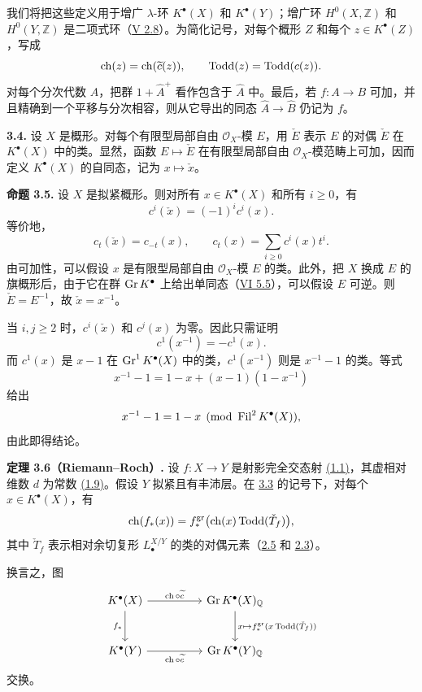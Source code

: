 我们将把这些定义用于增广 $\lambda$-环 $K^{\bullet}(X)$ 和 $K^{\bullet}(Y)$；增广环 $H^0(X,\mathbb Z)$ 和 $H^0(Y,\mathbb Z)$ 是二项式环（\hyperlink{sga6.e05.ex.2-8}{V 2.8}）。为简化记号，对每个概形 $Z$ 和每个 $z\in K^{\bullet}(Z)$，写成
\[
\operatorname{ch}(z)=\operatorname{ch}(\widetilde c(z)),
\qquad
\operatorname{Todd}(z)=\operatorname{Todd}(c(z)).
\]
对每个分次代数 $A$，把群 $1+\widehat A^+$ 看作包含于 $\widehat A$ 中。最后，若 $f:A\to B$ 可加，并且精确到一个平移与分次相容，则从它导出的同态 $\widehat A\to\widehat B$ 仍记为 $f$。

\textbf{3.4.} 设 $X$ 是概形。对每个有限型局部自由 $\mathcal O_X$-模 $E$，用 $\check E$ 表示 $E$ 的对偶 $\check E$ 在 $K^{\bullet}(X)$ 中的类。显然，函数 $E\mapsto\check E$ 在有限型局部自由 $\mathcal O_X$-模范畴上可加，因而定义 $K^{\bullet}(X)$ 的自同态，记为 $x\mapsto\check x$。

\textbf{命题 3.5.} 设 $X$ 是拟紧概形。则对所有 $x\in K^{\bullet}(X)$ 和所有 $i\geq0$，有
\[
c^i(\check x)=(-1)^i c^i(x).
\]
等价地，
\[
c_t(\check x)=c_{-t}(x),
\qquad
c_t(x)=\sum_{i\geq0}c^i(x)t^i.
\]
由可加性，可以假设 $x$ 是有限型局部自由 $\mathcal O_X$-模 $E$ 的类。此外，把 $X$ 换成 $E$ 的旗概形后，由于它在群 $\operatorname{Gr} K^{\bullet}$ 上给出单同态（\hyperlink{sga6.e06.cor.5-5}{VI 5.5}），可以假设 $E$ 可逆。则 $\check E=E^{-1}$，故 $\check x=x^{-1}$。

当 $i,j\geq2$ 时，$c^i(\check x)$ 和 $c^j(x)$ 为零。因此只需证明
\[
c^1(x^{-1})=-c^1(x).
\]
而 $c^1(x)$ 是 $x-1$ 在 $\operatorname{Gr}^1K^{\bullet}(X)$ 中的类，$c^1(x^{-1})$ 则是 $x^{-1}-1$ 的类。等式
\[
x^{-1}-1=1-x+(x-1)(1-x^{-1})
\]
给出
\[
x^{-1}-1=1-x\pmod{\operatorname{Fil}^2K^{\bullet}(X)},
\]
由此即得结论。

\textbf{定理 3.6（Riemann--Roch）.} 设 $f:X\to Y$ 是射影完全交态射 \hyperlink{sga6.e08.def.1-1}{(1.1)}，其虚相对维数 $d$ 为常数 \hyperlink{sga6.e08.def.1-9}{(1.9)}。假设 $Y$ 拟紧且有丰沛层。在 \hyperlink{sga6.e08.para.3-3}{3.3} 的记号下，对每个 $x\in K^{\bullet}(X)$，有
\[
\operatorname{ch}(f_*(x))=f^{\mathrm{gr}}_*\bigl(\operatorname{ch}(x)\operatorname{Todd}(\check T_f)\bigr),
\]
其中 $\check T_f$ 表示相对余切复形 $L^{X/Y}_\bullet$ 的类的对偶元素（\hyperlink{sga6.e08.cor.2-5}{2.5} 和 \hyperlink{sga6.e08.def.2-3}{2.3}）。

换言之，图
\[
\begin{tikzcd}[column sep=huge,row sep=large]
K^{\bullet}(X) \arrow[r,"\ch\circ\widetilde c"] \arrow[d,"f_*"'] & \Gr K^{\bullet}(X)_{\mathbb Q} \arrow[d,"x\mapsto f^{\mathrm{gr}}_*(x\Todd(\check T_f))"]\\
K^{\bullet}(Y) \arrow[r,"\ch\circ\widetilde c"'] & \Gr K^{\bullet}(Y)_{\mathbb Q}
\end{tikzcd}
\]
交换。



